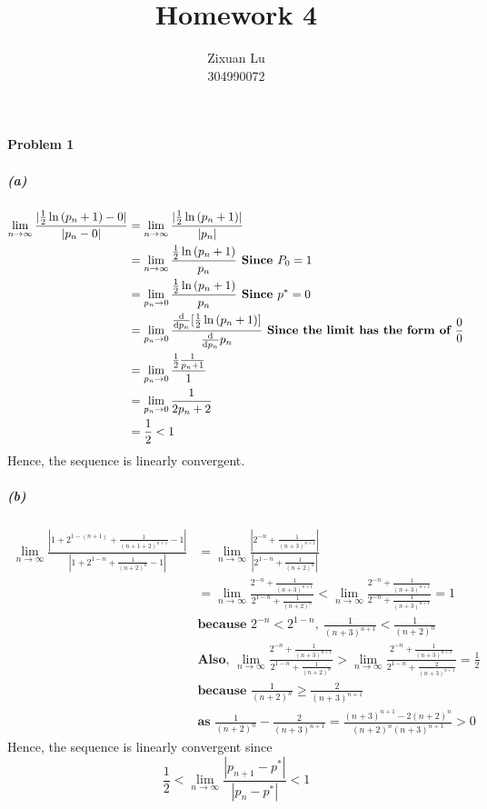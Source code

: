 \documentclass{article}
\author{Zixuan Lu \\ 304990072}
\title{\textbf{Homework 4}}
\begin{document}
\maketitle
\paragraph{Problem 1}
\subparagraph*{(a)} 
\begin{equation}\nonumber
\begin{split}
\lim_{n\to\infty}\frac{|\frac{1}{2}\ln{(p_n+1)}-0|}{|p_n-0|} &=\lim_{n\to\infty}\frac{|\frac{1}{2}\ln{(p_n+1)}|}{|p_n|} \\
&= \lim_{n\to\infty}\frac{\frac{1}{2}\ln{(p_n+1)}}{p_n} \textbf{ Since } P_0  = 1 \\
&=\lim_{p_n\to 0}\frac{\frac{1}{2}\ln{(p_n+1)}}{p_n} \textbf{ Since } p^* = 0 \\
&=\lim_{p_n\to 0}\frac{\dv{}{p_n}[\frac{1}{2}\ln{(p_n+1)}]}{\dv{}{p_n}p_n} \textbf{ Since the limit has the form of } \frac{0}{0} \\
&=\lim_{p_n\to 0}\frac{\frac{1}{2}\frac{1}{p_n+1}}{1} \\
&=\lim_{p_n\to 0}\frac{1}{2p_n+2} \\
&=\frac{1}{2} < 1
\end{split}
\end{equation}
Hence, the sequence is linearly convergent.
\subparagraph*{(b)}
\begin{equation}\nonumber
\begin{split}
\lim_{n\to\infty}\frac{|1+2^{1-(n+1)}+\frac{1}{(n+1+2)^{n+1}}-1|}{|1+2^{1-n}+\frac{1}{(n+2)^n}-1|} &= \lim_{n\to\infty}\frac{|2^{-n}+\frac{1}{(n+3)^{n+1}}|}{|2^{1-n}+\frac{1}{(n+2)^n}|} \\
&=\lim_{n\to\infty}\frac{2^{-n}+\frac{1}{(n+3)^{n+1}}}{2^{1-n}+\frac{1}{(n+2)^n}} < \lim_{n\to\infty}\frac{2^{-n}+\frac{1}{(n+3)^{n+1}}}{2^{-n}+\frac{1}{(n+3)^{n+1}}} = 1\\
& \textbf{because } 2^{-n} < 2^{1-n},\ \frac{1}{(n+3)^{n+1}} < \frac{1}{(n+2)^n} \\
& \textbf{Also, } \lim_{n\to\infty}\frac{2^{-n}+\frac{1}{(n+3)^{n+1}}}{2^{1-n}+\frac{1}{(n+2)^n}} > \lim_{n\to\infty}\frac{2^{-n}+\frac{1}{(n+3)^{n+1}}}{2^{1-n}+\frac{2}{(n+3)^{n+1}}} = \frac{1}{2} \\
& \textbf{because } \frac{1}{(n+2)^n} \geq \frac{2}{(n+3)^{n+1}} \\
& \textbf{as } \frac{1}{(n+2)^n} - \frac{2}{(n+3)^{n+1}} = \frac{(n+3)^{n+1}-2(n+2)^n}{(n+2)^n(n+3)^{n+1}} > 0 
\end{split}
\end{equation}
Hence, the sequence is linearly convergent since $$\frac{1}{2} < \lim_{n\to\infty}\frac{|p_{n+1}-p^*|}{|p_n-p^*|} < 1$$ 
\newpage
\end{document}
